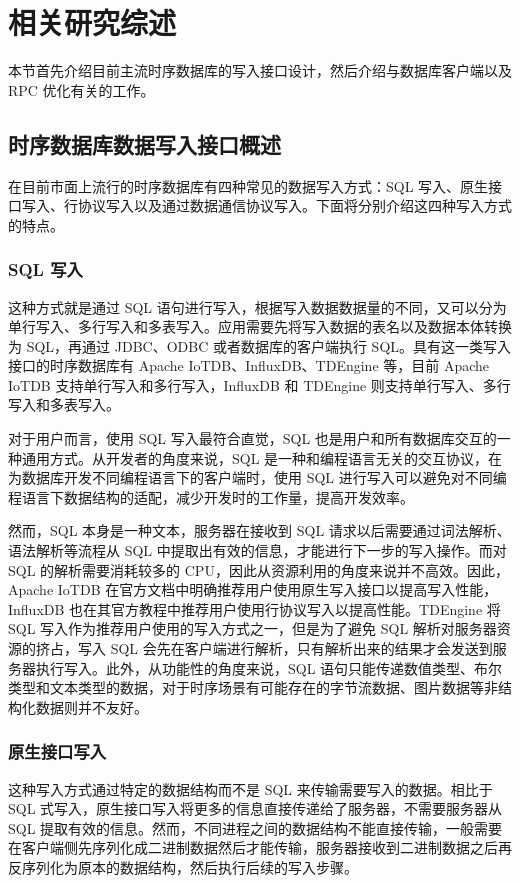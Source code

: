 
\chapter{相关研究综述}
本节首先介绍目前主流时序数据库的写入接口设计，然后介绍与数据库客户端以及 RPC 优化有关的工作。
\section{时序数据库数据写入接口概述}
在目前市面上流行的时序数据库有四种常见的数据写入方式：SQL 写入、原生接口写入、行协议写入以及通过数据通信协议写入。下面将分别介绍这四种写入方式的特点。
\subsection{SQL 写入}
这种方式就是通过 SQL 语句进行写入，根据写入数据数据量的不同，又可以分为单行写入、多行写入和多表写入。应用需要先将写入数据的表名以及数据本体转换为 SQL，再通过 JDBC、ODBC 或者数据库的客户端执行 SQL。具有这一类写入接口的时序数据库有 Apache IoTDB、InfluxDB、TDEngine 等，目前 Apache IoTDB 支持单行写入和多行写入，InfluxDB 和 TDEngine 则支持单行写入、多行写入和多表写入。

对于用户而言，使用 SQL 写入最符合直觉，SQL 也是用户和所有数据库交互的一种通用方式。从开发者的角度来说，SQL 是一种和编程语言无关的交互协议，在为数据库开发不同编程语言下的客户端时，使用 SQL 进行写入可以避免对不同编程语言下数据结构的适配，减少开发时的工作量，提高开发效率。

然而，SQL 本身是一种文本，服务器在接收到 SQL 请求以后需要通过词法解析、语法解析等流程从 SQL 中提取出有效的信息，才能进行下一步的写入操作。而对 SQL 的解析需要消耗较多的 CPU，因此从资源利用的角度来说并不高效。因此，Apache IoTDB 在官方文档中明确推荐用户使用原生写入接口以提高写入性能\cite{iotdb2024javanative}，InfluxDB 也在其官方教程中推荐用户使用行协议写入以提高性能\cite{influx2024highperformance}。TDEngine 将 SQL 写入作为推荐用户使用的写入方式之一，但是为了避免 SQL 解析对服务器资源的挤占，写入 SQL 会先在客户端进行解析，只有解析出来的结果才会发送到服务器执行写入。此外，从功能性的角度来说，SQL 语句只能传递数值类型、布尔类型和文本类型的数据，对于时序场景有可能存在的字节流数据、图片数据等非结构化数据则并不友好。
\subsection{原生接口写入}
这种写入方式通过特定的数据结构而不是 SQL 来传输需要写入的数据。相比于 SQL 式写入，原生接口写入将更多的信息直接传递给了服务器，不需要服务器从 SQL 提取有效的信息。然而，不同进程之间的数据结构不能直接传输，一般需要在客户端侧先序列化成二进制数据然后才能传输，服务器接收到二进制数据之后再反序列化为原本的数据结构，然后执行后续的写入步骤。

